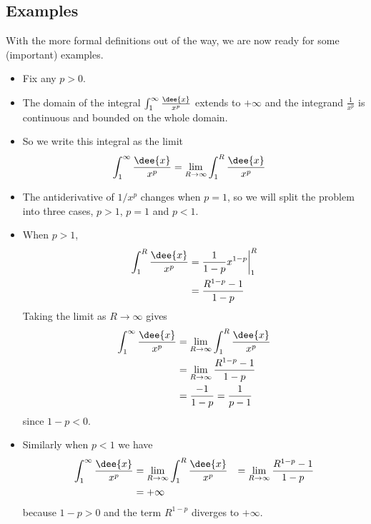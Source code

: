 \subsection{Examples}
With the more formal definitions out of the way, we are now ready for some (important)
examples.
\begin{eg}\label{eg:IMPp1}
\soln
\begin{itemize}
 \item Fix any $p>0$.
\item The domain of the integral $\int_1^\infty\frac{\dee{x}}{x^p}$
extends to $+\infty$ and the integrand $\frac{1}{x^p}$ is continuous and
bounded on the whole domain.
\item So we write this integral as the limit
\begin{align*}
\int_1^\infty\frac{\dee{x}}{x^p}
&=\lim_{R\rightarrow\infty} \int_1^R\frac{\dee{x}}{x^p}
\end{align*}
\item The antiderivative of $1/x^p$ changes when $p=1$, so we will split the problem into
three cases, $p>1$, $p=1$ and $p<1$.
\item When $p>1$,
\begin{align*}
  \int_1^R \frac{\dee{x}}{x^p}
  &= \frac{1}{1-p} x^{1-p} \bigg|_1^R \\
  &= \frac{R^{1-p}-1}{1-p}
\end{align*}
Taking the limit as $R \to \infty$ gives
\begin{align*}
  \int_1^\infty\frac{\dee{x}}{x^p}
  &= \lim_{R \to \infty} \int_1^R\frac{\dee{x}}{x^p} \\
  &= \lim_{R \to \infty} \frac{R^{1-p}-1}{1-p}\\
  &= \frac{-1}{1-p} = \frac{1}{p-1}
\end{align*}
since $1-p<0$.

\item Similarly when $p<1$ we have
\begin{align*}
\int_1^\infty\frac{\dee{x}}{x^p}
&= \lim_{R \to \infty} \int_1^R \frac{\dee{x}}{x^p}
&= \lim_{R \to \infty} \frac{R^{1-p}-1}{1-p}\\
  &= +\infty
\end{align*}
because $1-p>0$ and the term $R^{1-p}$ diverges to $+\infty$.


\end{itemize}
\end{eg}
